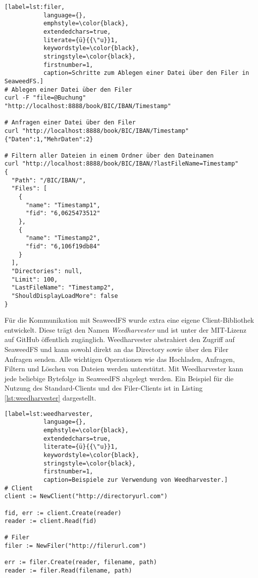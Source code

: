 \documentclass[12pt,oneside,a4paper,parskip]{scrbook}
\begin{document}
\begin{minipage}{\linewidth}
\begin{lstlisting}[label=lst:filer,
           language={},
           emphstyle=\color{black},
           extendedchars=true,
           literate={ü}{{\"u}}1,
           keywordstyle=\color{black},
           stringstyle=\color{black},
           firstnumber=1,
           caption=Schritte zum Ablegen einer Datei über den Filer in SeaweedFS.]           
# Ablegen einer Datei über den Filer
curl -F "file=@Buchung" "http://localhost:8888/book/BIC/IBAN/Timestamp"

# Anfragen einer Datei über den Filer
curl "http://localhost:8888/book/BIC/IBAN/Timestamp"
{"Daten":1,"MehrDaten":2}

# Filtern aller Dateien in einem Ordner über den Dateinamen
curl "http://localhost:8888/book/BIC/IBAN/?lastFileName=Timestamp"
{
  "Path": "/BIC/IBAN/",
  "Files": [
    {
      "name": "Timestamp1",
      "fid": "6,0625473512"
    },
    {
      "name": "Timestamp2",
      "fid": "6,106f19db84"
    }
  ],
  "Directories": null,
  "Limit": 100,
  "LastFileName": "Timestamp2",
  "ShouldDisplayLoadMore": false
}
\end{lstlisting}
\end{minipage}

Für die Kommunikation mit SeaweedFS wurde extra eine eigene Client-Bibliothek entwickelt. Diese trägt den Namen \textit{Weedharvester} und ist unter der MIT-Lizenz auf GitHub öffentlich zugänglich. Weedharvester abstrahiert den Zugriff auf SeaweedFS und kann sowohl direkt an das Directory sowie über den Filer Anfragen senden. Alle wichtigen Operationen wie das Hochladen, Anfragen, Filtern und Löschen von Dateien werden unterstützt. Mit Weedharvester kann jede beliebige Bytefolge in SeaweedFS abgelegt werden. Ein Beispiel für die Nutzung des Standard-Clients und des Filer-Clients ist in Listing \ref{lst:weedharvester} dargestellt.

\begin{minipage}{\linewidth}
\begin{lstlisting}[label=lst:weedharvester,
           language={},
           emphstyle=\color{black},
           extendedchars=true,
           literate={ü}{{\"u}}1,
           keywordstyle=\color{black},
           stringstyle=\color{black},
           firstnumber=1,
           caption=Beispiele zur Verwendung von Weedharvester.]          
# Client
client := NewClient("http://directoryurl.com")

fid, err := client.Create(reader)
reader := client.Read(fid)

# Filer
filer := NewFiler("http://filerurl.com")

err := filer.Create(reader, filename, path)
reader := filer.Read(filename, path)
\end{lstlisting}
\end{minipage}
\end{document}
